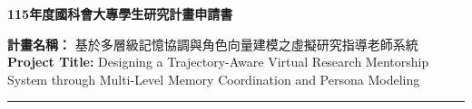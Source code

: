 \documentclass[12pt,a4paper]{article}
\newcommand{\DocTitle}[1]{\begin{center}\Large\bfseries #1\end{center}}
\newcommand{\RuleLine}{\vspace{0.4em}\hrule\vspace{0.4em}}
\begin{document}
\DocTitle{115年度國科會大專學生研究計畫申請書}

\noindent
\textbf{計畫名稱：}
基於多層級記憶協調與角色向量建模之虛擬研究指導老師系統\\
\textbf{Project Title:}
Designing a Trajectory-Aware Virtual Research Mentorship System through Multi-Level Memory Coordination and Persona Modeling

\RuleLine











\newpage
\renewcommand{\refname}{七、參考文獻}

\end{document}
